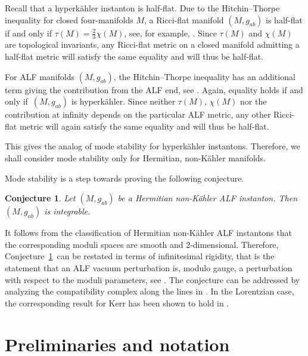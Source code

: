 \documentclass[10pt,a4paper]{amsart}
\numberwithin{equation}{section}
\newtheorem{Conjecture}[Theorem]{Conjecture}
 { \theoremstyle{definition}
\newtheorem{Definition}[Theorem]{Definition}
\newtheorem{Note}[Theorem]{Note}
\newtheorem{Example}[Theorem]{Example}
\newtheorem{Remark}[Theorem]{Remark} }
\begin{document}
\begin{Remark}\label{remark:halfflat}
Recall that a hyperk\"ahler instanton is half-flat. Due to the Hitchin--Thorpe inequality for closed four-manifolds $M$, a Ricci-flat manifold $(M,g_{ab})$ is half-flat if and only if $\tau(M)=\frac{2}{3}\chi(M)$, see, for example, \cite[Section~13.8]{MR2371700}. Since $\tau(M)$ and $\chi(M)$ are topological invariants, any Ricci-flat metric on a closed manifold admitting a half-flat metric will satisfy the same equality and will thus be half-flat.

For ALF manifolds $(M,g_{ab})$, the Hitchin--Thorpe inequality has an additional term giving the contribution from the ALF end, see \cite{Chen-Li21,Dai-Wei07}. Again, equality holds if and only if~$(M,g_{ab})$ is hyperk\"ahler. Since neither $\tau(M)$, $\chi(M)$ nor the contribution at infinity depends on the particular ALF metric, any other Ricci-flat metric will again satisfy the same equality and will thus be half-flat.

This gives the analog of mode stability for hyperk\"ahler instantons. Therefore, we shall consider mode stability only for Hermitian, non-K\"ahler manifolds.
\end{Remark}

Mode stability is a step towards proving the following conjecture.
\begin{Conjecture} \label{conj:integ}
Let $(M, g_{ab})$ be a Hermitian non-K\"ahler ALF instanton. Then $(M,g_{ab})$ is integrable.
\end{Conjecture}

\begin{Remark}%
It follows from the classification of Hermitian non-K\"ahler ALF instantons that the corresponding moduli spaces are smooth and 2-dimensional. Therefore, Conjecture~\ref{conj:integ}~can be restated in terms of infinitesimal rigidity, that is the statement that an ALF vacuum perturbation is, modulo gauge, a perturbation with respect to the moduli parameters, see \cite{2024CQGra..41h5004N}.
The conjecture can be addressed by analyzing the compatibility complex along the lines in \cite{AABKW}.
In the Lorentzian case, the corresponding result for Kerr has been shown to hold in \cite{2022arXiv220712952A}.
\end{Remark}




\section{Preliminaries and notation} \label{sec:preliminaries}
\end{document}
